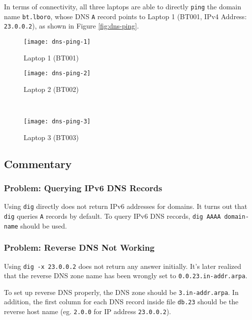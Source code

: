 In terms of connectivity, all three laptops are able to directly \texttt{ping} the domain name \texttt{bt.lboro}, whose DNS \texttt{A} record points to Laptop 1 (BT001, IPv4 Address: \texttt{23.0.0.2}), as shown in Figure \ref{fig:dns-ping}.

\begin{figure*}[ht!]
    \centering
    \begin{subfigure}[b]{0.67\textwidth}
        \centering
        \texttt{[image: dns-ping-1]}
        \caption{Laptop 1 (BT001)}
    \end{subfigure}
    \hfill
    \begin{minipage}[b]{0.3\textwidth}
	    \begin{subfigure}[b]{\linewidth}
	        \centering
	        \texttt{[image: dns-ping-2]}
	        \caption{Laptop 2 (BT002)}
	    \end{subfigure}
	    \\
	    \begin{subfigure}[b]{\linewidth}
	        \centering
	        \texttt{[image: dns-ping-3]}
	        \caption{Laptop 3 (BT003)}
	    \end{subfigure}
	\end{minipage}
    \caption{Connectivity to \texttt{bt.lboro} using \texttt{ping} on all $3$ Laptops.}
    \label{fig:dns-ping}
\end{figure*}


\clearpage





\subsection{Commentary}


\subsubsection{Problem: Querying IPv6 DNS Records}
Using \texttt{dig} directly does not return IPv6 addresses for domains. It turns out that \texttt{dig} queries \texttt{A} records by default. To query IPv6 DNS records, \texttt{dig AAAA domain-name} should be used.

\subsubsection{Problem: Reverse DNS Not Working}
Using \texttt{dig -x 23.0.0.2} does not return any answer initially.
It's later realized that the reverse DNS zone name has been wrongly set to \texttt{0.0.23.in-addr.arpa}.

To set up reverse DNS properly, the DNS zone should be \texttt{3.in-addr.arpa}. In addition, the first column for each DNS record inside file \texttt{db.23} should be the reverse host name (eg. \texttt{2.0.0} for IP address \texttt{23.0.0.2}). 



